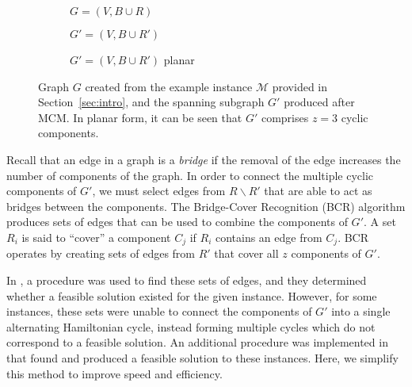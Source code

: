 \documentclass{elsarticle}
\begin{document}
\begin{figure}[H]	
	\centering
	\begin{subfigure}[h]{0.3\textwidth}
		
		\caption{$G = (V, B \cup R)$}
		\label{fig:threshold}
	\end{subfigure} \hspace{5mm}
	\begin{subfigure}[h]{0.3\textwidth}
		
		\caption{$G' = (V, B \cup R')$}
		\label{fig:matching}
	\end{subfigure} \hspace{5mm}
	\begin{subfigure}[h]{0.243\textwidth}
		
		\caption{$G' = (V, B \cup R')$ planar}
		\label{fig:mps}
	\end{subfigure}
	\caption{Graph $G$ created from the example instance $\mathcal{M}$ provided in Section~\ref{sec:intro}, and the spanning subgraph $G'$ produced after MCM. In planar form, it can be seen that $G'$ comprises $z = 3$ cyclic components.}
	\label{fig:mcm}
\end{figure}

\noindent Recall that an edge in a graph is a \emph{bridge} if the removal of the edge increases the number of components of the graph. In order to connect the multiple cyclic components of $G'$, we must select edges from $R \backslash R'$ that are able to act as bridges between the components. The Bridge-Cover Recognition (BCR) algorithm produces sets of edges that can be used to combine the components of $G'$. A set $R_i$ is said to ``cover'' a component $C_j$ if $R_i$ contains an edge from $C_j$. BCR operates by creating sets of edges from $R'$ that cover all $z$ components of $G'$. 

In \cite{becker2010}, a procedure was used to find these sets of edges, and they determined whether a feasible solution existed for the given instance. However, for some instances, these sets were unable to connect the components of $G'$ into a single alternating Hamiltonian cycle, instead forming multiple cycles which do not correspond to a feasible solution. An additional procedure was implemented in \cite{hawa2018} that found and produced a feasible solution to these instances. Here, we simplify this method to improve speed and efficiency.
\end{document}
